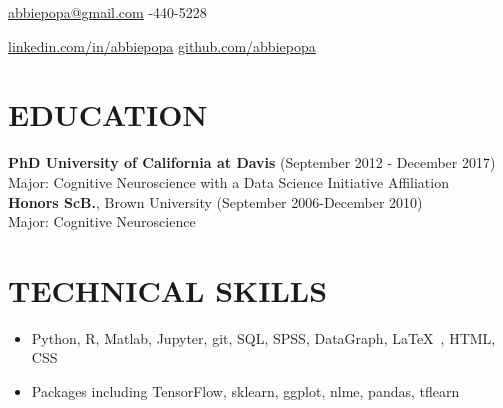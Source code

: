 \documentclass[line,margin,10pt]{res}
\begin{document}
 
\begin{resume}
\hoffset\centerline 
{\hyperref[abbiepopa@gmail.com]{abbiepopa@gmail.com} \quad \quad \quad \quad  \quad \quad \quad \quad \quad \quad \quad \quad \quad \quad \quad \quad \quad \quad \quad \quad \quad\quad \quad \quad \quad \quad \quad \quad \quad \quad \quad \quad  \quad \quad {}-440-5228}
\hoffset\centerline 
{\hspace{0.05cm} \hyperref[linkedin.com/in/abbiepopa]{linkedin.com/in/abbiepopa} \quad \quad \quad \quad \quad \quad \quad \quad \quad \quad \quad\quad \quad \quad \quad \quad \quad \quad \quad \quad \quad \quad  \quad \quad \quad  \quad \quad \quad   \quad \hyperref[github.com/abbiepopa]{github.com/abbiepopa}}
 
\section{EDUCATION} 
\textbf{PhD University of California at Davis} \hfill (September 2012 - December 2017)\\
Major: Cognitive Neuroscience with a Data Science Initiative Affiliation\\
\textbf{Honors ScB.}, Brown University \hfill (September 2006-December 2010)\\
                Major: Cognitive Neuroscience
                
 \section{TECHNICAL SKILLS} 
 \begin{itemize}[leftmargin=-2pt] \itemsep -2pt
\item [] Python, R, Matlab, Jupyter, git, SQL, SPSS, DataGraph, \LaTeX\ , HTML, CSS
\item []Packages including TensorFlow, sklearn, ggplot, nlme, pandas,  tflearn
 \end{itemize}
								

\end{resume}
\end{document}
